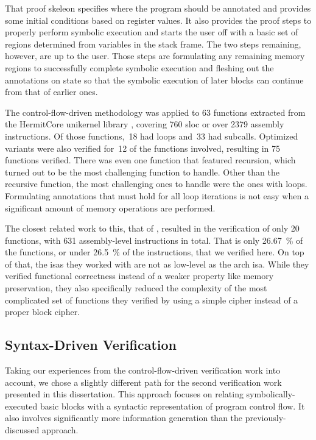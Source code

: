 That proof skeleon specifies where the program should be annotated
and provides some initial conditions based on register values.
It also provides the proof steps to properly perform symbolic execution
and starts the user off with a basic set of regions
determined from variables in the stack frame.
The two steps remaining, however, are up to the user.
Those steps are formulating any remaining memory regions
to successfully complete symbolic execution
and fleshing out the annotations on state so that the symbolic execution of later blocks
can continue from that of earlier ones.

The control-flow-driven methodology was applied to \num{63} functions
extracted from the HermitCore  \autocite{lankes2016hermitcore}
unikernel library \autocite{madhavapeddy2014unikernels},
covering \num{760} \ac{sloc} or over \num{2379} assembly instructions.
Of those functions,~18 had loops and~33 had subcalls.
Optimized variants were also verified for~12 of the functions involved,
resulting in \num{75} functions verified.
There was even one function that featured recursion,
which turned out to be the most challenging function to handle.
Other than the recursive function, the most challenging ones to handle
were the ones with loops. Formulating annotations that must hold for all loop iterations
is not easy when a significant amount of memory operations are performed.

The closest related work to this, that of \textcite{matthews2006verification},
resulted in the verification of only \num{20} functions,
with \num{631} assembly-level instructions in total.
That is only \SI{26.67}{\percent} of the functions,
or under \SI{26.5}{\percent} of the instructions, that we verified here.
On top of that, the \acp{isa} they worked with are not as low-level as the \gls{arch} \ac{isa}.
While they verified functional correctness
instead of a weaker property like memory preservation,
they also specifically reduced the complexity
of the most complicated set of functions they verified
by using a simple  cipher instead of a proper block cipher.

\subsection{Syntax-Driven Verification}
Taking our experiences from the control-flow-driven verification work into account,
we chose a slightly different path for the second verification work
presented in this dissertation.
This approach focuses on relating symbolically-executed basic blocks
with a syntactic representation of program control flow.
It also involves significantly more information generation
than the previously-discussed approach.

